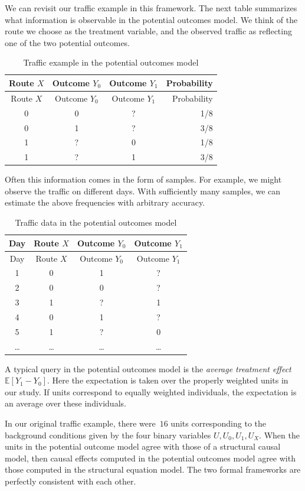 \documentclass{tufte-book}
\begin{document}
We can revisit our traffic example in this framework. The next table
summarizes what information is observable in the potential outcomes
model. We think of the route we choose as the treatment variable, and
the observed traffic as reflecting one of the two potential outcomes.

\begin{longtable}[]{@{}cccr@{}}
\caption{Traffic example in the potential outcomes model}\tabularnewline
\toprule
Route \(X\) & Outcome \(Y_0\) & Outcome \(Y_1\) & Probability \\
\midrule
\endfirsthead
\toprule
Route \(X\) & Outcome \(Y_0\) & Outcome \(Y_1\) & Probability \\
\midrule
\endhead
0 & 0 & ? & 1/8 \\
0 & 1 & ? & 3/8 \\
1 & ? & 0 & 1/8 \\
1 & ? & 1 & 3/8 \\
\bottomrule
\end{longtable}

Often this information comes in the form of samples. For example, we
might observe the traffic on different days. With sufficiently many
samples, we can estimate the above frequencies with arbitrary accuracy.

\begin{longtable}[]{@{}cccc@{}}
\caption{Traffic data in the potential outcomes model}\tabularnewline
\toprule
Day & Route \(X\) & Outcome \(Y_0\) & Outcome \(Y_1\) \\
\midrule
\endfirsthead
\toprule
Day & Route \(X\) & Outcome \(Y_0\) & Outcome \(Y_1\) \\
\midrule
\endhead
1 & 0 & 1 & ? \\
2 & 0 & 0 & ? \\
3 & 1 & ? & 1 \\
4 & 0 & 1 & ? \\
5 & 1 & ? & 0 \\
\ldots{} & \ldots{} & \ldots{} & \ldots{} \\
\bottomrule
\end{longtable}

A typical query in the potential outcomes model is the \emph{average
treatment effect} \(\mathbb{E}[Y_1 - Y_0].\) Here the expectation is
taken over the properly weighted units in our study. If units correspond
to equally weighted individuals, the expectation is an average over
these individuals.

In our original traffic example, there were~\(16\) units corresponding
to the background conditions given by the four binary variables
\(U, U_0, U_1, U_X\). When the units in the potential outcome model
agree with those of a structural causal model, then causal effects
computed in the potential outcomes model agree with those computed in
the structural equation model. The two formal frameworks are perfectly
consistent with each other.
\end{document}
